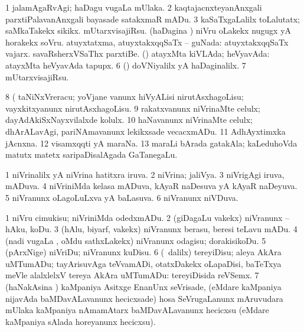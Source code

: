 \noindent 
\gl{\pagu}
\expl{}
\bmng
\bnum
\num{1}  jalamAgaRvAgi; haDagu \mo vugaLa mUlaka. 
\num{2}  kaqtajacnxteyanAnxgali parxtiPalavanAnxgali bayasade satakxmaR mADu. 
\num{3}  kaSaTxgaLalilx toLalutatx; saMkaTakekx sikikx. 
  
\banum
{} mUtarxvisajiRsu. 
 (haDagina \vi) niVru oLakekx nugugx yA horakekx soVru. 
\eanum
\numie
{}  
\banum
{} atuyxtatxma, atuyxtakxqqSaTx -- guNada:  atuyxtakxqqSaTx vajarx.  savaRsherxVSaThx parxtiBe. 
 (\hiV) atayxMta kiVLAda; heVyavAda:  atayxMta heVyavAda tapupx. 
\eanum
\numie
\num{6}  (\rUpa) doVNiyalilx yA haDaginalilx. 
\num{7}  mUtarxvisajiRsu. 
\num{8}  (  taNiNxVreracu; yoVjane \mo vanunx hiVyALisi nirutAsxhagoLisu; vayxkitxyanunx nirutAsxhagoLisu. 
\num{9}  rakatxvanunx niVrinaMte celulx; dayAdAkiSxNayxvilalxde kolulx. 
\num{10}  haNavanunx niVrinaMte celulx; dhArALavAgi, pariNAmavanunx lekikxsade vecacxmADu. 
\num{11}  AdhAyxtimxka jAcnxna. 
\num{12}  visamxqqti yA maraNa. 
\num{13}    maraLi bArada gatakAla; kaLeduhoVda matutx matetx saripaDisalAgada GaTanegaLu. 
\enum
\emng
\eentry

\bentry
{} 
\gl{\gu}
\expl{}
\bmng
\bnum
\num{1} niVrinalilx yA niVrina hatitxra iruva. 
\num{2} niVrina; jaliVya. 
\num{3} niVrigAgi iruva, mADuva. 
\num{4} niVriniMda kelasa mADuva, kAyaR naDesuva yA kAyaR naDeyuva. 
\num{5} niVranunx oLagoLuLxva yA baLasuva.
\num{6} niVranunx niVDuva. 
\enum
\emng
\eentry

\bentry
{} 
\gl{\sakirx}
\expl{}
\bmng
\bnum
\num{1} niVru cimukisu; niVriniMda odedxmADu. 
\num{2} (giDagaLu \mo vakekx) niVranunx -- hAku, koDu. 
\num{3} (hAlu, biyarf, \mo vakekx) niVranunx berasu, beresi teLavu mADu. 
\num{4} (nadi \mo vugaLa \vi, oMdu sathxLakekx) niVranunx odagisu; dorakisikoDu. 
\num{5} (pArxNige) niVriDu; niVranunx kuDisu. 
\num{6} (\kanmu\ \BUkaq dalilx) tereyiDisu; aleya AkAra uMTumADu; tayArisuvAga teVvamADi, otatxDakekx oLapaDisi, baTeTxya meVle alalxlelxV tereya AkAra uMTumADu:  tereyiDisida reVSemx. 
\num{7} (haNakAsina \vi) kaMpaniya Asitxge EnanUnx seVrisade, (eMdare kaMpaniya nijavAda baMDavALavanunx hecicxsade) hosa SeVrugaLanunx mAruvudara mUlaka kaMpaniya nAmamAtarx baMDavALavanunx hecicxsu (eMdare kaMpaniya sAlada horeyanunx hecicxsu). 
\enum
\emng

